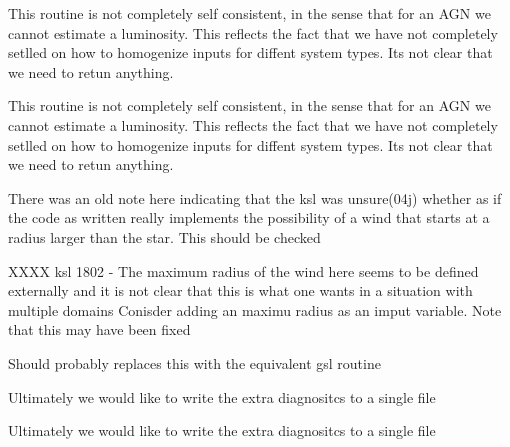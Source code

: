 \begin{DoxyRefList}
\item[\label{bug__bug000057}%
\Hypertarget{bug__bug000057}%
Global \hyperlink{templates_8h_a5e18aeda5d11190333c93b952b562b04}{get\+\_\+stellar\+\_\+params} (void)]This routine is not completely self consistent, in the sense that for an A\+GN we cannot estimate a luminosity. This reflects the fact that we have not completely setlled on how to homogenize inputs for diffent system types. It\textquotesingle{}s not clear that we need to retun anything. 
\item[\label{bug__bug000057}%
\Hypertarget{bug__bug000057}%
Global \hyperlink{templates_8h_a5e18aeda5d11190333c93b952b562b04}{get\+\_\+stellar\+\_\+params} (void)]This routine is not completely self consistent, in the sense that for an A\+GN we cannot estimate a luminosity. This reflects the fact that we have not completely setlled on how to homogenize inputs for diffent system types. It\textquotesingle{}s not clear that we need to retun anything. 
\item[\label{bug__bug000060}%
\Hypertarget{bug__bug000060}%
Global \hyperlink{templates_8h_a40edef16d314acc2a892cd8b8a5f0eec}{get\+\_\+stellar\+\_\+wind\+\_\+params} (int ndom)]There was an old note here indicating that the ksl was unsure(04j) whether as if the code as written really implements the possibility of a wind that starts at a radius larger than the star. This should be checked 
\item[\label{bug__bug000031}%
\Hypertarget{bug__bug000031}%
File \hyperlink{homologous_8c}{homologous.c} ]X\+X\+XX ksl 1802 -\/ The maximum radius of the wind here seems to be defined externally and it is not clear that this is what one wants in a situation with multiple domains Conisder adding an maximu radius as an imput variable. Note that this may have been fixed  
\item[\label{bug__bug000029}%
\Hypertarget{bug__bug000029}%
Global \hyperlink{get__atomicdata_8c_a8b5d80d6f35b55e30551b5ae6b5cc269}{indexx} (int n, arrin, indx)]Should probably replaces this with the equivalent gsl routine 
\item[\label{bug__bug000019}%
\Hypertarget{bug__bug000019}%
Global \hyperlink{templates_8h_acbb582e8c0def41044e2d4d8aac0c752}{init\+\_\+extra\+\_\+diagnostics} (void)]Ultimately we would like to write the extra diagnositcs to a single file 
\item[\label{bug__bug000019}%
\Hypertarget{bug__bug000019}%
Global \hyperlink{templates_8h_acbb582e8c0def41044e2d4d8aac0c752}{init\+\_\+extra\+\_\+diagnostics} (void)]Ultimately we would like to write the extra diagnositcs to a single file 

\end{DoxyRefList}
